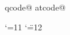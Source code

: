 %
%
%
%
%
%
%
%

\expandafter\edef\csname qqcode\string @
\expandafter\edef\csname atcode\string @

\catcode`\@=11
\catcode`\"=12

\def\eat@#1{}

\def\hexnumber@#1{\ifcase#10\or 1\or 2\or 3\or 4\or 5\or 6\or 7\or 8\or
 9\or A\or B\or C\or D\or E\or F\fi}

\def\encode#1#2{\count@#2\relax
 \ifnum\count@<\sixt@@n
 \expandafter\edef
  \csname\expandafter\eat@\string#1@HX\endcsname{0\hexnumber@\count@}%
 \else
  {\count\z@\count@\divide\count\z@\sixt@@n
  \edef\next@{\hexnumber@{\count\z@}}%
  \multiply\count\z@\sixt@@n\advance\count@-\count\z@
  \expandafter\xdef
   \csname\expandafter\eat@\string#1@HX\endcsname{\next@\hexnumber@\count@}}%
  \fi}





